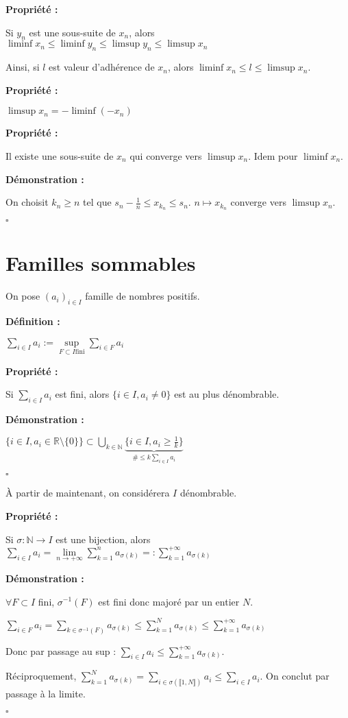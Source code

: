 \documentclass[10pt,a4paper,notitlepage ]{article}
\newenvironment{definition}{
	
	\textbf{Définition : }
}
{}
\newenvironment{propriete}{
	\begin{tcolorbox}
		\textbf{Propriété : }
}
{\end{tcolorbox}}
\newenvironment{demo}{

	\textbf{Démonstration :}
}{\begin{flushright}
	$\square$
\end{flushright}
}
\begin{document}
\begin{propriete}
	Si $y_n$ est une sous-suite de $x_n$, alors $\liminf x_n \le \liminf y_n \le \limsup y_n \le \limsup x_n$
\end{propriete}

Ainsi, si $l$ est valeur d'adhérence de $x_n$, alors $\liminf x_n \le l \le \limsup x_n$.
\begin{propriete}
	$\limsup x_n = -\liminf (-x_n)$
\end{propriete}

\begin{propriete}
	Il existe une sous-suite de $x_n$ qui converge vers $\limsup x_n$. Idem pour $\liminf x_n$.
\end{propriete}
\begin{demo}
	On choisit $k_n \ge n$ tel que $s_n - \frac{1}{n} \le x_{k_n} \le s_n$. $n \mapsto x_{k_n}$ converge vers $\limsup x_n$.
\end{demo}

\part*{Familles sommables}

On pose $(a_i)_{i\in I}$ famille de nombres positifs.

\begin{definition}
	$\sum_{i \in I} a_i := \underset{F \subset I \mathrm{fini}}{\sup}\sum_{i \in F}a_i$
\end{definition}
\begin{propriete}
	Si $\sum_{i \in I} a_i$ est fini, alors $\{i \in I, a_i\neq 0\}$ est au plus dénombrable.
\end{propriete}

\begin{demo}
	$\{i\in I, a_i \in \mathbb R \setminus \{0\}\} \subset \underset{k \in \mathbb N}{\bigcup}
	\underset{\# \le k\sum_{i\in I} a_i}{\underbrace{\{i \in I, a_i \ge \frac{1}{k}\}}}$
\end{demo}

À partir de maintenant, on considérera $I$ dénombrable.

\begin{propriete}
	Si $\sigma : \mathbb N \rightarrow I$ est une bijection, alors
	$\sum_{i\in I}a_i = \underset{n \rightarrow +\infty}{\lim}\sum_{k=1}^{n}a_{\sigma (k)} =: \sum_{k=1}^{+\infty}a_{\sigma(k)}$
\end{propriete}

\begin{demo}
	$\forall F \subset I$ fini, $\sigma ^{-1}(F)$ est fini donc majoré par un entier $N$.
	
	$\sum_{i\in F}a_i = \sum_{k\in \sigma^{-1}(F)}a_{\sigma(k)} \le \sum_{k=1}^N a_{\sigma(k)} \le \sum_{k=1}^{+\infty}a_{\sigma(k)}$
	
	Donc par passage au sup : $\sum_{i\in I} a_i \le \sum_{k=1}^{+\infty}a_{\sigma(k)}$.
	
	Réciproquement, $\sum_{k=1}^N a_{\sigma(k)} = \sum_{i\in\sigma(\llbracket 1,N \rrbracket)} a_i \le \sum_{i\in I}a_i$. On conclut par passage à la limite.
\end{demo}
\end{document}
